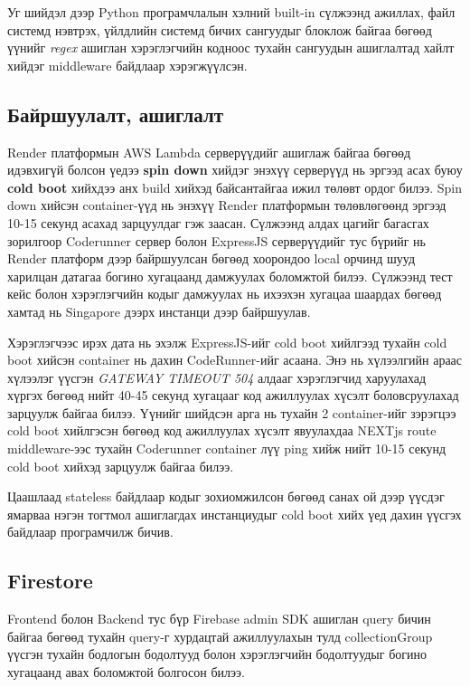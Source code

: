 Уг шийдэл дээр Python програмчлалын хэлний built-in сүлжээнд ажиллах, файл системд нэвтрэх, үйлдлийн системд бичих сангуудыг блоклож байгаа бөгөөд үүнийг \textit{regex} ашиглан хэрэглэгчийн кодноос тухайн сангуудын ашиглалтад хайлт хийдэг middleware байдлаар хэрэгжүүлсэн.

\subsection{Байршуулалт, ашиглалт}
Render платформын AWS Lambda серверүүдийг ашиглаж байгаа бөгөөд идэвхигүй болсон үедээ \textbf{spin down} хийдэг энэхүү серверүүд нь эргээд асах буюу \textbf{cold boot} хийхдээ анх build хийхэд байсантайгаа ижил төлөвт ордог билээ\cite{renderfree}. Spin down хийсэн container-үүд нь энэхүү Render платформын төлөвлөгөөнд эргээд 10-15 секунд асахад зарцуулдаг гэж заасан. Сүлжээнд алдах цагийг багасгах зорилгоор Coderunner сервер болон ExpressJS серверүүдийг тус бүрийг нь Render платформ дээр байршуулсан бөгөөд хоорондоо local орчинд шууд харилцан датагаа богино хугацаанд дамжуулах боломжтой билээ. Сүлжээнд тест кейс болон хэрэглэгчийн кодыг дамжуулах нь ихээхэн хугацаа шаардах бөгөөд хамтад нь Singapore дээрх инстанци дээр байршуулав. 

Хэрэглэгчээс ирэх дата нь эхэлж ExpressJS-ийг cold boot хийлгээд тухайн cold boot хийсэн container нь дахин CodeRunner-ийг асаана. Энэ нь хүлээлгийн араас хүлээлэг үүсгэн \textit{GATEWAY TIMEOUT 504} алдааг хэрэглэгчид харуулахад хүргэх бөгөөд нийт 40-45 секунд хугацааг код ажиллуулах хүсэлт боловсруулахад зарцуулж байгаа билээ. Үүнийг шийдсэн арга нь тухайн 2 container-ийг зэрэгцээ cold boot хийлгэсэн бөгөөд код ажиллуулах хүсэлт явуулахдаа NEXTjs route middleware-ээс тухайн Coderunner container лүү ping хийж нийт 10-15 секунд cold boot хийхэд зарцуулж байгаа билээ. 

Цаашлаад stateless байдлаар кодыг зохиомжилсон бөгөөд санах ой дээр үүсдэг ямарваа нэгэн тогтмол ашиглагдах инстанциудыг cold boot хийх үед дахин үүсгэх байдлаар програмчилж бичив.

\subsection{Firestore}
Frontend болон Backend тус бүр Firebase admin SDK ашиглан query бичин байгаа бөгөөд тухайн query-г хурдацтай ажиллуулахын тулд collectionGroup үүсгэн тухайн бодлогын бодолтууд болон хэрэглэгчийн бодолтуудыг богино хугацаанд авах боломжтой болгосон билээ.

